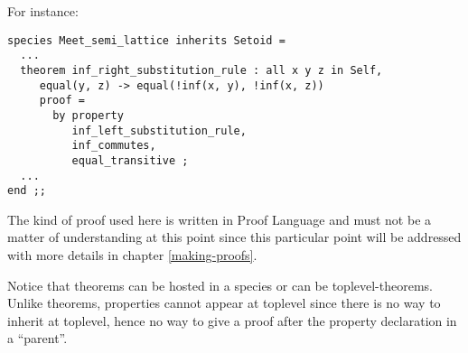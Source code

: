 \noindent For instance:

{\scriptsize
\begin{lstlisting}
species Meet_semi_lattice inherits Setoid =
  ...
  theorem inf_right_substitution_rule : all x y z in Self,
     equal(y, z) -> equal(!inf(x, y), !inf(x, z))
     proof =
       by property
          inf_left_substitution_rule,
          inf_commutes,
          equal_transitive ;
  ...
end ;;
\end{lstlisting}}
The kind of proof used here is written in {\focal} Proof Language and
must not be a matter of understanding at this point since this
particular point will be addressed with more details in chapter
\ref{making-proofs}.

Notice that theorems can be hosted in a species or can be
toplevel-theorems.
Unlike theorems, properties cannot appear at
toplevel since there is no way to inherit at toplevel, hence no
way to give a proof after the property declaration in a ``parent''.
